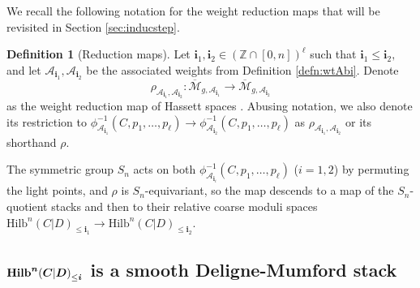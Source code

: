 \documentclass[10.5pt]{amsart}
\theoremstyle{definition}
\theoremstyle{definition}
\theoremstyle{definition}
\theoremstyle{definition}
\newtheorem{definition}[theorem]{Definition}
\newcommand{\ol}[1]{\overline{#1}}
\newcommand{\Mcal}{\mathcal{M}}
\newcommand{\Mbar}{\ol{\Mcal}}
\newcommand{\Hilb}{\mathrm{Hilb}}
\newcommand{\bi}{\boldsymbol{i}}
\newcommand{\TS}[1]{{\color{pink} #1}}
\begin{document}
    


We recall the following notation for the weight reduction maps that will be revisited in Section \ref{sec:inducstep}.

\begin{definition}[Reduction maps]
    Let $\bi_1, \bi_2\in (\mathbb{Z}\cap [0,n])^\ell$ such that $\bi_1\leq \bi_2,$ and let $\mathcal{A}_{\bi_1}, \mathcal{A}_{\bi_2}$ be the associated weights from Definition \ref{defn:wtAbi}. Denote $$\rho_{\mathcal{A}_{\bi_1},\mathcal{A}_{\bi_2}}: \Mbar_{g, \mathcal{A}_{\bi_1}}\to \Mbar_{g, \mathcal{A}_{\bi_2}}$$ as the weight reduction map of Hassett spaces \cite[Theorem 4.1]{hassett}. Abusing notation, we also denote its restriction to $\phi_{\mathcal{A}_{\bi_1}}^{-1}(C, p_1,\dots,p_\ell)\to \phi_{\mathcal{A}_{\bi_2}}^{-1}(C, p_1,\dots,p_\ell)$ as $\rho_{\mathcal{A}_{\bi_1},\mathcal{A}_{\bi_2}}$ or its shorthand $\rho.$

    The symmetric group $S_n$ acts on both $\phi_{\mathcal{A}_{\bi_i}}^{-1}(C, p_1,\dots,p_\ell)$ ($i = 1,2$) by permuting the light points, and $\rho$ is $S_n$-equivariant, so the map descends to a map of the $S_n$-quotient stacks and then to their relative coarse moduli spaces $\Hilb^n(C|D)_{\leq \bi_1}\to \Hilb^n(C|D)_{\leq \bi_2}.$
\end{definition}





\subsection{$\textbf{\text{Hilb}}^{\boldsymbol{n}}{(\boldsymbol{C}|\boldsymbol{D})}_{\leq \bi}$ is a smooth Deligne-Mumford stack}
\end{document}

